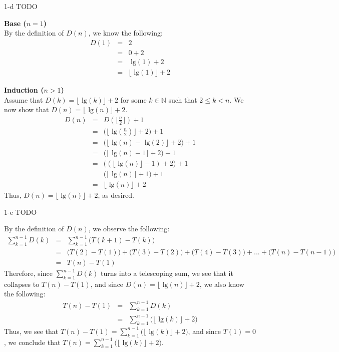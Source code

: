 \documentclass[11pt]{article}
\newcommand{\tlg}{\text{ lg}}
\begin{document}
\begin{prob}{1-d}
TODO
\end{prob}
\begin{sol}
\textbf{Base ($n = 1$)} \\
By the definition of $D(n)$, we know the following:
\begin{eqnarray*}
D(1) & = & 2 \\ 
& = & 0 + 2 \\
& = & \tlg(1) + 2 \\
& = & \lfloor\tlg(1)\rfloor + 2 
\end{eqnarray*}

\textbf{Induction ($n > 1$)} \\
Assume that $D(k) = \lfloor\tlg(k)\rfloor + 2$ for some $k \in \mathbb{N}$ such that $2 \leq k < n$. We now show that $D(n) = \lfloor\tlg(n)\rfloor + 2$.
\begin{eqnarray*}
D(n) & = &  D(\lfloor\frac{n}{2}\rfloor) + 1 \\
& = & \Big(\lfloor\tlg(\frac{n}{2})\rfloor + 2\Big) + 1 \\
& = & \Big(\lfloor\tlg(n) - \tlg(2)\rfloor + 2\Big) + 1 \\
& = & \Big(\lfloor\tlg(n) - 1\rfloor + 2\Big) + 1 \\
& = & \Big((\lfloor\tlg(n)\rfloor - 1) + 2\Big) + 1 \\
& = & \Big(\lfloor\tlg(n)\rfloor + 1\Big) + 1 \\
& = & \lfloor\tlg(n)\rfloor + 2
\end{eqnarray*}
Thus, $D(n) = \lfloor\tlg(n)\rfloor + 2$, as desired.
\end{sol}

\begin{prob}{1-e}
TODO
\end{prob}
\begin{sol}
By the definition of $D(n)$, we observe the following:
\begin{eqnarray*}
\sum_{k=1}^{n-1}D(k) & = & \sum_{k=1}^{n-1}\Big(T(k + 1) - T(k)\Big) \\
& = & \big(T(2) - T(1)\big) + \big(T(3) - T(2)\big) + \big(T(4) - T(3)\big) + ... + \big(T(n) - T(n-1)\big) \\
& = & T(n) - T(1) 
\end{eqnarray*}
Therefore, since $\sum_{k=1}^{n-1}D(k)$ turns into a telescoping sum, we see that it collapses to $T(n) - T(1)$, and since $D(n) = \lfloor\tlg(n)\rfloor + 2$, we also know the following:
\begin{eqnarray*}
T(n) - T(1) & = & \sum_{k=1}^{n-1}D(k) \\
& = & \sum_{k=1}^{n-1}\big(\lfloor\tlg(k)\rfloor + 2\big)
\end{eqnarray*}
Thus, we see that $T(n) - T(1) = \sum_{k=1}^{n-1}\big(\lfloor\tlg(k)\rfloor + 2\big)$, and since $T(1) = 0$, we conclude that $T(n) = \sum_{k=1}^{n-1}\big(\lfloor\tlg(k)\rfloor + 2\big)$.
\end{sol}
\end{document}

